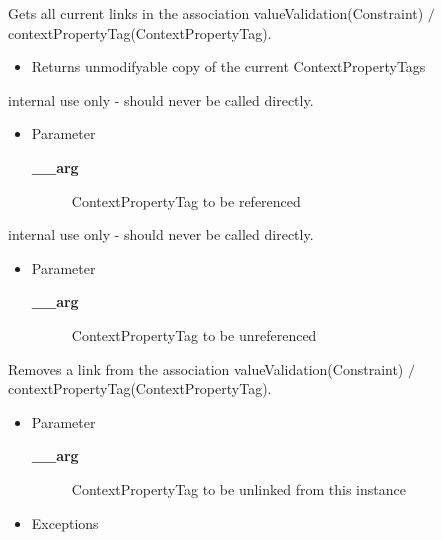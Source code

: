 \begin{desc}Gets all current links in the association valueValidation(Constraint)
             $/$ contextPropertyTag(ContextPropertyTag).
\begin{itemize}
\item{Returns unmodifyable copy of the current ContextPropertyTags }
\end{itemize}
\end{desc}

\begin{desc}internal use only - should never be called directly.
\begin{itemize}
\item{Parameter
  \begin{description}
   \item[{\bf \_\_arg}]{ContextPropertyTag to be referenced}
  \end{description}}
\end{itemize}
\end{desc}

\begin{desc}internal use only - should never be called directly.
\begin{itemize}
\item{Parameter
  \begin{description}
   \item[{\bf \_\_arg}]{ContextPropertyTag to be unreferenced}
  \end{description}}
\end{itemize}
\end{desc}

\begin{desc}Removes a link from the association valueValidation(Constraint)
             $/$ contextPropertyTag(ContextPropertyTag).
\begin{itemize}
\item{Parameter
  \begin{description}
   \item[{\bf \_\_arg}]{ContextPropertyTag to be unlinked from this instance}
  \end{description}}
\end{itemize}
\begin{itemize}
\item{{Exceptions}
}
\end{itemize}
\end{desc}

